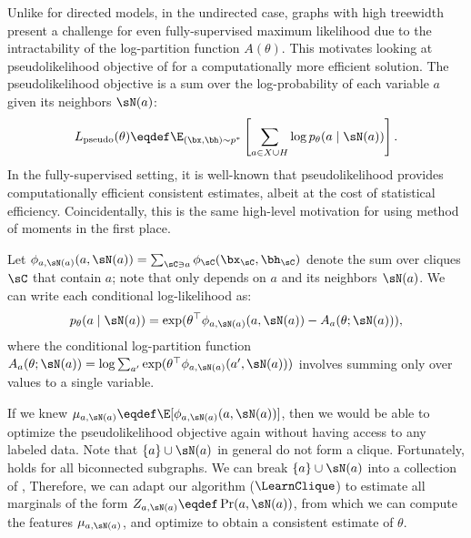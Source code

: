 Unlike for directed models, in the undirected case,
graphs with high treewidth present a challenge
for even fully-supervised maximum likelihood due to the intractability of the log-partition function $A(\theta)$.
This motivates looking at pseudolikelihood objective of \citep{besag75pseudo} for a computationally more
efficient solution.
The pseudolikelihood objective is a sum over the log-probability of each variable $a$ given its neighbors $\sN(a)$:
\begin{align}
  \label{eqn:pseudolikelihood}
L_\text{pseudo}(\theta) \eqdef \E_{(\bx,\bh) \sim p^*}\left[\sum_{a \in X \cup H} \log p_\theta(a \mid \sN(a))\right].
\end{align}
In the fully-supervised setting, it is well-known that pseudolikelihood provides computationally efficient consistent estimates,
albeit at the cost of statistical efficiency.
Coincidentally, this is the same high-level motivation for using method of moments in the first place.

Let $\phi_{a,\sN(a)}(a, \sN(a)) = \sum_{\sC \ni a} \phi_\sC(\bx_\sC,\bh_\sC)$
denote the sum over cliques $\sC$ that contain $a$; note that only depends on $a$ and its neighbors $\sN(a)$.
We can write each conditional log-likelihood as:
\begin{align}
p_\theta(a \mid \sN(a)) = \exp(\theta^\top\phi_{a,\sN(a)}(a, \sN(a)) - A_a(\theta; \sN(a))),
\end{align}
where the conditional log-partition function $A_a(\theta; \sN(a)) = \log \sum_{a'} \exp(\theta^\top\phi_{a,\sN(a)}(a', \sN(a)))$
involves summing only over values to a single variable.

If we knew $\mu_{a,\sN(a)} \eqdef \E[\phi_{a,\sN(a)}(a,\sN(a))]$,
then we would be able to optimize the pseudolikelihood objective again without
having access to any labeled data.
Note that $\{a\}\cup\sN(a)$ in general do not form a clique.
Fortunately,  holds for all biconnected subgraphs.
We can break $\{a\}\cup\sN(a)$ into a collection of 
  ,
  Therefore, we can adapt our algorithm ($\LearnClique$) to estimate all marginals of the form $Z_{a,\sN(a)} \eqdef \Pr(a,\sN(a))$,
  from which we can compute the features $\mu_{a,\sN(a)}$,
  and optimize  to obtain a consistent estimate of $\theta$.

